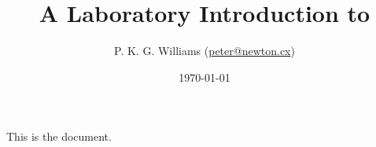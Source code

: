 \documentclass[letterpaper,11pt,titlepage]{article}
\title{A Laboratory Introduction to \git}
\author{P. K. G. Williams (\href{mailto:peter@newton.cx}{peter@newton.cx})}
\date{\today}
\begin{document}
\maketitle

This is the document.
\end{document}
